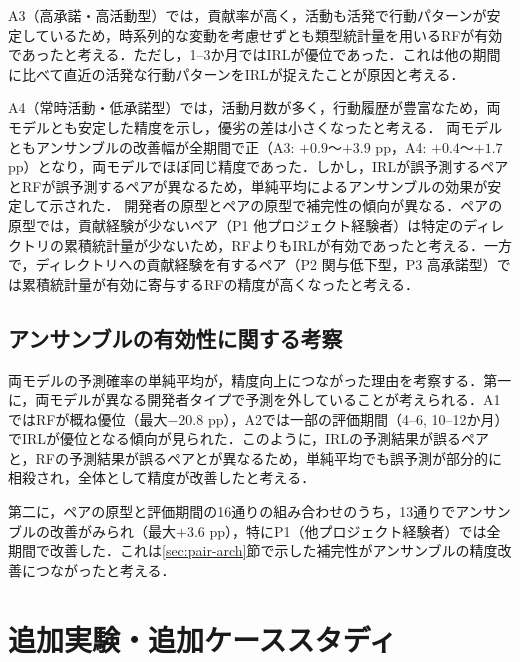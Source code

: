\documentclass[submit,noauthor,ses,dvipdfmx]{ipsj}
\newcommand{\fixstart}{\color{magenta}}
\newcommand{\fixend}{\color{black}}
\begin{document}
A3（高承諾・高活動型）では，貢献率が高く，活動も活発で行動パターンが安定しているため，時系列的な変動を考慮せずとも類型統計量を用いるRFが有効であったと考える．ただし，1--3か月ではIRLが優位であった．これは他の期間に比べて直近の活発な行動パターンをIRLが\fixstart 捉えた\fixend ことが原因と考える．

A4（常時活動・低承諾型）では，活動月数が多く，行動履歴が豊富なため，両モデルとも安定した精度を示し，優劣の差は小さくなったと考える．
両モデルともアンサンブルの改善幅が全期間で正（A3: $+0.9$〜$+3.9$ pp，A4: $+0.4$〜$+1.7$ pp）となり，両モデルでほぼ同じ精度であった．しかし，IRLが誤予測するペアとRFが誤予測するペアが異なるため，単純平均によるアンサンブルの効果が安定して示された．
開発者の原型とペアの原型で補完性の傾向が異なる．ペアの原型では，貢献経験が少ないペア（P1 他プロジェクト経験者）は特定のディレクトリの累積統計量が少ないため，RFよりもIRLが有効であったと考える．一方で，ディレクトリへの貢献経験を有するペア（P2 関与低下型，P3 高承諾型）では累積統計量が有効に寄与するRFの精度が高くなったと考える．


\vspace{-3mm}
\subsection{アンサンブルの有効性に関する考察}
両モデルの予測確率の単純平均が，精度向上につながった理由を考察する．第一に，両モデルが異なる開発者タイプで予測を外していることが考えられる．A1ではRFが概ね優位（最大$-20.8$ pp），A2では一部の評価期間（4--6, 10--12か月）でIRLが優位となる傾向が見られた．このように，IRLの予測結果が誤るペアと，RFの予測結果が誤るペアとが異なるため，単純平均でも誤予測が部分的に相殺され，全体として精度が改善したと考える．

第二に，ペアの原型と評価期間の16通りの組み合わせのうち，13通りでアンサンブルの改善がみられ（最大$+3.6$ pp），特にP1（他プロジェクト経験者）では全期間で改善した．これは\ref{sec:pair-arch}節で示した補完性がアンサンブルの精度改善につながったと考える．

\fixstart
\section{追加実験・追加ケーススタディ}\label{sec:aosp}
\end{document}
